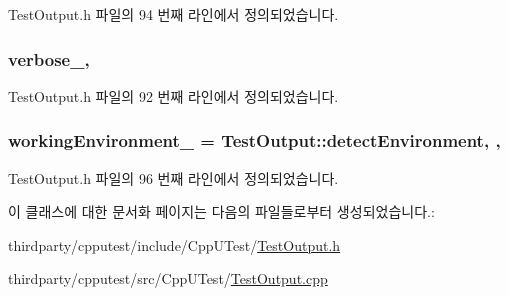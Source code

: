 Test\+Output.\+h 파일의 94 번째 라인에서 정의되었습니다.

\subsubsection[{\texorpdfstring{verbose\+\_\+}{verbose_}}]{ verbose\+\_\+\hspace{0.3cm}{\ttfamily [protected]}, {\ttfamily [inherited]}}\hypertarget{class_test_output_a86126da532c138842a42d8e9a52b0806}{}\label{class_test_output_a86126da532c138842a42d8e9a52b0806}


Test\+Output.\+h 파일의 92 번째 라인에서 정의되었습니다.

\subsubsection[{\texorpdfstring{working\+Environment\+\_\+}{workingEnvironment_}}]{ working\+Environment\+\_\+ = {\bf Test\+Output\+::detect\+Environment}\hspace{0.3cm}{\ttfamily [static]}, {\ttfamily [protected]}, {\ttfamily [inherited]}}\hypertarget{class_test_output_a8b622cfce4b95599cd31b61a777d68ef}{}\label{class_test_output_a8b622cfce4b95599cd31b61a777d68ef}


Test\+Output.\+h 파일의 96 번째 라인에서 정의되었습니다.



이 클래스에 대한 문서화 페이지는 다음의 파일들로부터 생성되었습니다.\+:\begin{DoxyCompactItemize}
\item 
thirdparty/cpputest/include/\+Cpp\+U\+Test/\hyperlink{_test_output_8h}{Test\+Output.\+h}\item 
thirdparty/cpputest/src/\+Cpp\+U\+Test/\hyperlink{_test_output_8cpp}{Test\+Output.\+cpp}\end{DoxyCompactItemize}
